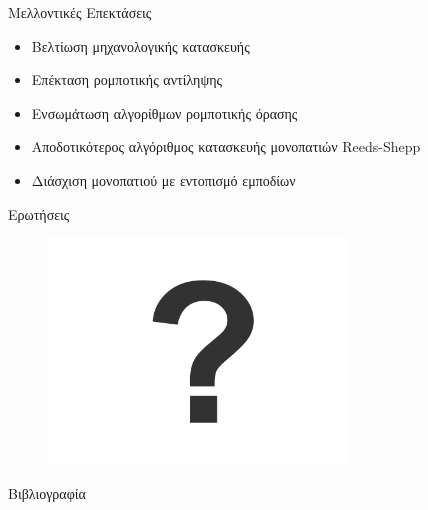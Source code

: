 \documentclass[10pt, compress, handout]{beamer} %
\begin{document}
\begin{frame}{Μελλοντικές Επεκτάσεις}
	\begin{itemize}
		\item Βελτίωση	μηχανολογικής κατασκευής
		\item Επέκταση ρομποτικής αντίληψης
		\item Ενσωμάτωση αλγορίθμων ρομποτικής όρασης
		\item Αποδοτικότερος αλγόριθμος κατασκευής μονοπατιών Reeds-Shepp
		\item Διάσχιση μονοπατιού με εντοπισμό εμποδίων
	\end{itemize}
\end{frame}

\begin{frame}{Ερωτήσεις}
	\begin{figure}
		\includegraphics[height=6cm]{Figures/question_mark.png}
	\end{figure}
\end{frame}

\begin{frame}[allowframebreaks]{Βιβλιογραφία}
	\nocite{*}
	\printbibliography
\end{frame}
\end{document}
